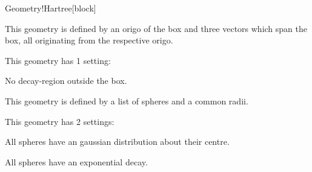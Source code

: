 \begin{fdfentry}{Geometry!Hartree}[block]
\begin{fdfoptions}
\begin{fdfoptions}
    \end{fdfoptions}


    \option[Box]%

    This geometry is defined by an origo of the box and three vectors
    which span the box, all originating from the respective origo.

    This geometry has 1 setting:
    \begin{fdfoptions}
      \option[delta] %
      No decay-region outside the box.
      
    \end{fdfoptions}


    \option[Spheres]%
    
    This geometry is defined by a list of spheres and a common radii.
    
    This geometry has 2 settings:
    \begin{fdfoptions}
      
      \option[gauss] %
      All spheres have an gaussian distribution about their centre.
      
      \option[exp] %
      All spheres have an exponential decay.
      
    \end{fdfoptions}
    
  \end{fdfoptions}


\end{fdfentry}
